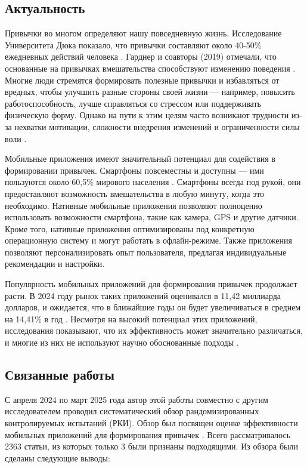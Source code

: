 \documentclass[pdflatex,sn-mathphys-num]{sn-jnl}%
\theoremstyle{thmstyleone}%
\theoremstyle{thmstyletwo}%
\theoremstyle{thmstylethree}%
\begin{document}
\subsection{Актуальность}\label{Relevance}

Привычки во многом определяют нашу повседневную жизнь. Исследование Университета Дюка показало, что привычки составляют около 40-50\% ежедневных действий человека \cite{wood_habits_2002}. Гарднер и соавторы (2019) отмечали, что основанные на привычках вмешательства способствуют изменению поведения \cite{gardner_habit_2019}. Многие люди стремятся формировать полезные привычки и избавляться от вредных, чтобы улучшить разные стороны своей жизни — например, повысить работоспособность, лучше справляться со стрессом или поддерживать физическую форму. Однако на пути к этим целям часто возникают трудности из-за нехватки мотивации, сложности внедрения изменений и ограниченности силы воли \cite{gardner_making_2012, noauthor_what_nodate}.

Мобильные приложения имеют значительный потенциал для содействия в формировании привычек. Смартфоны повсеместны и доступны — ими пользуются около 60,5\% мирового населения \cite{gill_how_2025}. Смартфоны всегда под рукой, они предоставляют возможность вмешательства в любую минуту, когда это необходимо. Нативные мобильные приложения позволяют полноценно использовать возможности смартфона, такие как камера, GPS и другие датчики. Кроме того, нативные приложения  оптимизированы под конкретную операционную систему и могут работать в офлайн-режиме. Также приложения позволяют персонализировать опыт пользователя, предлагая индивидуальные рекомендации и настройки.

Популярность мобильных приложений для формирования привычек продолжает расти. В 2024 году рынок таких приложений оценивался в 11,42 миллиарда долларов, и ожидается, что в ближайшие годы он будет увеличиваться в среднем на 14,41\% в год \cite{httpswwweconmarketresearchcom_habit_nodate}. Несмотря на высокий потенциал этих приложений, исследования показывают, что их эффективность может значительно различаться, и многие из них не используют научно обоснованные подходы \cite{lally_how_2010, stawarz_beyond_2015}.

\subsection{Связанные работы}\label{Related Works}

С апреля 2024 по март 2025 года автор этой работы совместно с другим исследователем проводил систематический обзор рандомизированных контролируемых испытаний (РКИ). Обзор был посвящен оценке эффективности мобильных приложений для формирования привычек \cite{dementyev_impact_2025}. Всего рассматривалось 2363 статьи, из которых только 3 были признаны подходящими. Из обзора были сделаны следующие выводы:
\end{document}
